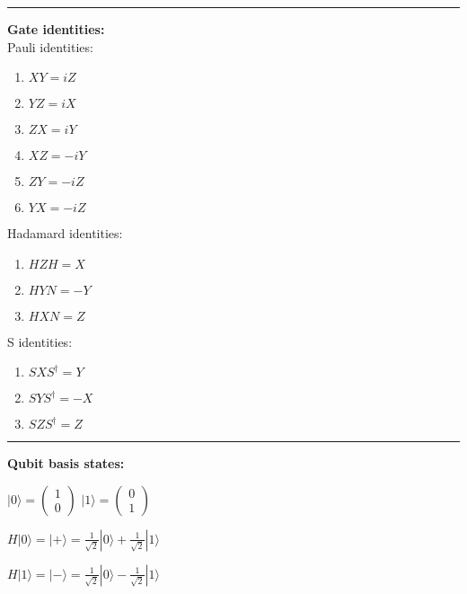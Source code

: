 \documentclass{article}
\begin{document}
\vspace{5pt}
\hrule
\vspace{5pt}

\textbf{Gate identities:} \\


Pauli identities:
\begin{multicols}{2}
	\begin{enumerate}
		\item $ XY = iZ $
		\item $ YZ = iX $
		\item $ ZX = iY $
	\columnbreak
		\item $ XZ = -iY $
		\item $ ZY = -iZ $
		\item $ YX = -iZ $
	\end{enumerate}
\end{multicols}

\begin{multicols}{2}
Hadamard identities:
	\begin{enumerate}
		\item $ HZH = X $
		\item $ HYN = -Y $
		\item $ HXN = Z $
	\end{enumerate}
\columnbreak

S identities:
	\begin{enumerate}
		\item $ SXS^\dagger = Y $
		\item $ SYS^\dagger  = -X $
		\item $ SZS^\dagger  = Z $
	\end{enumerate}
\end{multicols}

\vspace{5pt}
\hrule
\vspace{5pt}
\textbf{Qubit basis states:}

\begin{center}
$ |0\rangle =  \left(
				\begin{array}{c}
					 1 \\
					 0
				\end{array}
			\right)
$
\quad
$ |1\rangle =  \left(
				\begin{array}{c}
					 0 \\
					 1
				\end{array}
			\right)
$
\end{center}

\begin{center}
$H|0\rangle = |+ \rangle =  \frac{1}{\sqrt{2}} |0\rangle + \frac{1}{\sqrt{2}}|1\rangle$

$H|1\rangle = |- \rangle = \frac{1}{\sqrt{2}} |0\rangle - \frac{1}{\sqrt{2}}|1\rangle$
\end{center}
\end{document}
